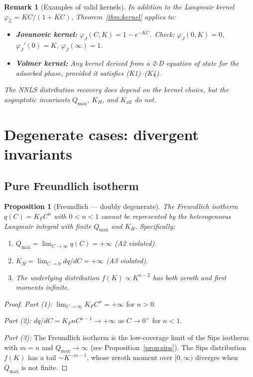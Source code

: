 \documentclass[12pt]{article}
\newtheorem{proposition}{Proposition}
\newtheorem{remark}{Remark}
\begin{document}
\begin{remark}[Examples of valid kernels]
In addition to the Langmuir kernel $\varphi_L=KC/(1+KC)$,
Theorem~\ref{thm:kernel} applies to:
\begin{itemize}[nosep]
  \item \textbf{Jovanovic kernel:}
        $\varphi_J(C,K)=1-e^{-KC}$.
        Check: $\varphi_J(0,K)=0$, $\varphi_J'(0)=K$,
        $\varphi_J(\infty)=1$.
  \item \textbf{Volmer kernel:}
        Any kernel derived from a 2-D equation of state for the
        adsorbed phase, provided it satisfies (K1)--(K4).
\end{itemize}
The NNLS distribution recovery \emph{does} depend on the kernel
choice, but the asymptotic invariants $Q_{\max}$, $K_H$, and
$K_{\mathrm{aff}}$ do not.
\end{remark}

\section{Degenerate cases: divergent invariants}
\label{sec:degenerate}

\subsection{Pure Freundlich isotherm}

\begin{proposition}[Freundlich --- doubly degenerate]
\label{prop:freundlich}
The Freundlich isotherm $q(C)=K_F C^{n}$ with $0<n<1$ cannot be
represented by the heterogeneous Langmuir integral with finite
$Q_{\max}$ and $K_H$.  Specifically:
\begin{enumerate}[nosep]
  \item $Q_{\max}=\lim_{C\to\infty}q(C)=+\infty$
        \quad (A2 violated).
  \item $K_H=\lim_{C\to 0}dq/dC=+\infty$
        \quad (A3 violated).
  \item The underlying distribution $f(K)\propto K^{n-2}$ has both
        zeroth and first moments infinite.
\end{enumerate}
\end{proposition}

\begin{proof}
\textit{Part (1):} $\lim_{C\to\infty}K_F C^n=+\infty$ for $n>0$.

\textit{Part (2):}
$dq/dC=K_F n C^{n-1}\to+\infty$ as $C\to 0^+$ for $n<1$.

\textit{Part (3):}
The Freundlich isotherm is the low-coverage limit of the Sips
isotherm with $m=n$ and $Q_{\max}\to\infty$ (see
Proposition~\ref{prop:sips}).
The Sips distribution $f(K)$ has a tail $\sim K^{-m-1}$,
whose zeroth moment over $[0,\infty)$ diverges when $Q_{\max}$ is
not finite.
\end{proof}
\end{document}
